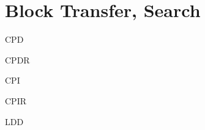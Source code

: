 \section{Block Transfer, Search}

\begin{minipage}{\textwidth}
	
\begin{instrtable}

	\begin{instruction}{CPD} 
		\Symbol{\SymCPD[0]}
			\FlagsCPD
		\SkipToSymbol
			\Symbol{\SymCPD[1]}
			\FromSymbolToOpCode
		\SkipToSymbol
			\Symbol{\SymCPD[2]}
	\end{instruction}

	\begin{instruction}{CPDR} 
		\Symbol{\SymCPDR[0]}
			\FlagsCPDR
		\SkipToSymbol
			\Symbol{\SymCPDR[1]}
			\FromSymbolToOpCode
			\Cycles{}{}
		\SkipToOpCode
			\OpCode{}{}{}
			\Hex{}{}
		\SkipToOpCode
			\OpCode{}{}{}
			\Hex{}{}
			\Cycles{}{}
	\end{instruction}

	\begin{instruction}{CPI} 
		\Symbol{\SymCPI[0]}
			\FlagsCPI
		\SkipToSymbol
			\Symbol{\SymCPI[1]}
			\FromSymbolToOpCode
		\SkipToSymbol
			\Symbol{\SymCPI[2]}
	\end{instruction}
	
	\begin{instruction}{CPIR} 
		\Symbol{\SymCPIR[0]}
			\FlagsCPIR
		\SkipToSymbol
			\Symbol{\SymCPIR[1]}
			\FromSymbolToOpCode
			\Cycles{}{}
		\SkipToOpCode
			\OpCode{}{}{}
			\Hex{}{}
		\SkipToOpCode
			\OpCode{}{}{}
			\Hex{}{}
			\Cycles{}{}
	\end{instruction}

	\begin{instruction}{LDD} 
		\Symbol{\SymLDD[0]}
			\FlagsLDD
		\SkipToSymbol
			\Symbol{\SymLDD[1]}
			\FromSymbolToOpCode
		\SkipToSymbol
			\Symbol{\SymLDD[2]}
		\SkipToSymbol
			\Symbol{\SymLDD[3]}
	\end{instruction}


\end{instrtable}
\end{minipage}
